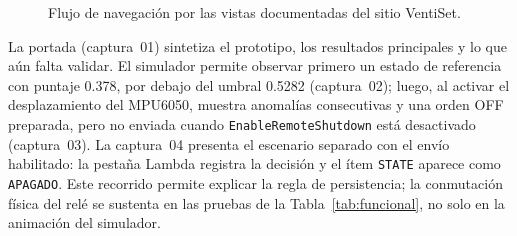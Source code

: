 \documentclass[10pt,twocolumn]{article}
\newcommand{\code}[1]{\texttt{\small #1}}
\begin{document}
\begin{figure}[t]
\centering
{}
\caption{Flujo de navegación por las vistas documentadas del sitio VentiSet.}
\label{fig:web-recorrido}
\end{figure}

La portada (captura~01) sintetiza el prototipo, los resultados principales y lo que aún falta
validar. El simulador permite observar primero un estado de referencia con puntaje 0.378, por
debajo del umbral 0.5282 (captura~02); luego, al activar el desplazamiento del MPU6050, muestra
anomalías consecutivas y una orden OFF preparada, pero no enviada cuando
\code{EnableRemoteShutdown} está desactivado (captura~03). La captura~04 presenta el escenario
separado con el envío habilitado: la pestaña Lambda registra la decisión y el ítem \code{STATE}
aparece como \code{APAGADO}. Este recorrido permite explicar la regla de persistencia; la
conmutación física del relé se sustenta en las pruebas de la Tabla~\ref{tab:funcional}, no solo en
la animación del simulador.
\end{document}
